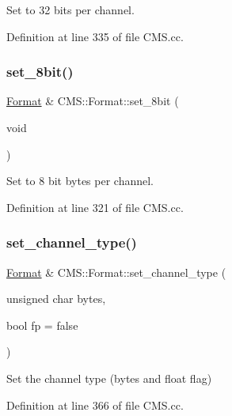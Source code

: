 Set to 32 bits per channel. 



Definition at line 335 of file C\+M\+S.\+cc.

\mbox{\label{class_c_m_s_1_1_format_ae2da002111dc9de26377bce8abb29aac}} 
\subsubsection{\texorpdfstring{set\+\_\+8bit()}{set\_8bit()}}
{\footnotesize\ttfamily \hyperlink{class_c_m_s_1_1_format}{Format} \& C\+M\+S\+::\+Format\+::set\+\_\+8bit (\begin{DoxyParamCaption}\item[{void}]{ }\end{DoxyParamCaption})}



Set to 8 bit bytes per channel. 



Definition at line 321 of file C\+M\+S.\+cc.

\mbox{\label{class_c_m_s_1_1_format_a9ef5f81a9303fd9626fc0b4004d7a01f}} 
\subsubsection{\texorpdfstring{set\+\_\+channel\+\_\+type()}{set\_channel\_type()}\hspace{0.1cm}{\footnotesize\ttfamily [1/8]}}
{\footnotesize\ttfamily \hyperlink{class_c_m_s_1_1_format}{Format} \& C\+M\+S\+::\+Format\+::set\+\_\+channel\+\_\+type (\begin{DoxyParamCaption}\item[{unsigned char}]{bytes,  }\item[{bool}]{fp = {\ttfamily false} }\end{DoxyParamCaption})}



Set the channel type (bytes and float flag) 



Definition at line 366 of file C\+M\+S.\+cc.

